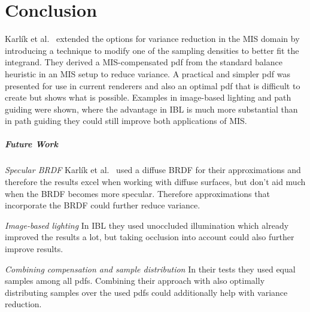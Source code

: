 \chapter{Conclusion}
\label{ch:Conclusion}
Karl\'ik et al.~\cite{Karlik2019} extended the options for variance reduction in the MIS domain
by introducing a technique to modify one of the sampling densities to better fit the integrand.
They derived a MIS-compensated pdf from the standard balance heuristic in an MIS setup to reduce variance.
A practical and simpler pdf was presented for use in current renderers
and also an optimal pdf that is difficult to create but shows what is possible.
Examples in image-based lighting and path guiding were shown,
where the advantage in IBL is much more substantial than in path guiding they could still improve both applications of MIS.


\paragraph{Future Work}
\label{par:future_work}
\textit{Specular BRDF} Karl\'ik et al.~\cite{Karlik2019} used a diffuse BRDF for their approximations
and therefore the results excel when working with diffuse surfaces,
but don't aid much when the BRDF becomes more specular.
Therefore approximations that incorporate the BRDF could further reduce variance.

\textit{Image-based lighting} In IBL they used unoccluded illumination which already improved the results a lot,
but taking occlusion into account could also further improve results.

\textit{Combining compensation and sample distribution} In their tests they used equal samples among all pdfs.
Combining their approach with also optimally distributing samples over the used pdfs could additionally help with variance reduction.